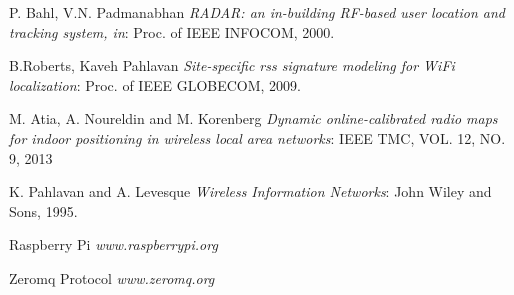 \documentclass[10pt,conference]{IEEEtran}
\begin{document}
\begin{thebibliography}{1}

 P. Bahl, V.N. Padmanabhan {\em RADAR: an in-building RF-based user location and tracking system, in}: Proc. of IEEE INFOCOM, 2000.

 B.Roberts, Kaveh Pahlavan {\em Site-specific rss signature modeling for WiFi localization}: Proc. of IEEE GLOBECOM, 2009.

 M. Atia, A. Noureldin and M. Korenberg {\em Dynamic online-calibrated radio maps for indoor positioning in wireless local area networks}: IEEE TMC, VOL. 12, NO. 9, 2013

 K. Pahlavan and A. Levesque {\em Wireless Information Networks}: John Wiley and Sons, 1995.

 Raspberry Pi {\em www.raspberrypi.org}

 Zeromq Protocol {\em www.zeromq.org}

\end{thebibliography}
\end{document}
